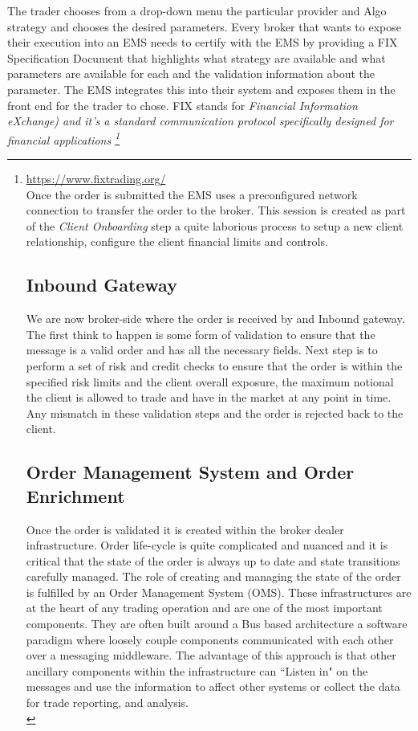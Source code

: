 The trader chooses from a drop-down menu the particular provider and Algo strategy and  chooses the desired parameters. Every broker that wants to expose their execution into an EMS needs to certify with the EMS by providing a FIX Specification Document that highlights what strategy are available and what parameters are available for each and the validation information about the parameter. The EMS integrates this into their system and exposes them in the front end for the trader to chose. FIX stands for \emph{Financial Information eXchange) and it's a standard communication protocol specifically designed for financial applications \footnote{\url{https://www.fixtrading.org/}\\

Once the order is submitted the EMS uses a preconfigured network connection to transfer the order to the broker. This session is created as part of the \emph{ Client Onboarding} step a quite laborious process to setup a new client relationship, configure the client financial limits and controls.

\subsection{Inbound Gateway}
We are now broker-side where the order is received by and Inbound gateway. The first think to happen is some form of validation to ensure that the message is a valid order and has all the necessary fields. Next step is to perform a set of risk and credit checks to ensure that the order is within the specified risk limits and the client overall exposure, the maximum notional the client is allowed to trade and have in the market at any point in time. Any mismatch in these validation steps and the order is rejected back to the client.

\subsection{Order Management System and Order Enrichment}
Once the order is validated it is created within the broker dealer infrastructure. Order life-cycle is quite complicated and nuanced and it is critical that the state of the order is always up to date and state transitions carefully managed. The role of creating and managing the state of the order is fulfilled by an Order Management System (OMS). These infrastructures are at the heart of any trading operation and are one of the most important components. They are often built around a Bus based architecture a software paradigm where loosely couple components communicated with each other over a messaging middleware. The advantage of this approach is that other ancillary components within the infrastructure can ``Listen in" on the messages and use the information to affect other systems or collect the data for trade reporting, and analysis.\\

}}
